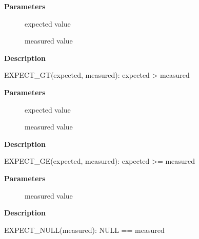 \documentclass[a4paper,8pt,english]{sphinxmanual}
\begin{document}
\textbf{Parameters}
\begin{description}
\item[{}] \leavevmode
expected value

\item[{}] \leavevmode
measured value

\end{description}

\textbf{Description}

EXPECT\_GT(expected, measured): expected \textgreater{} measured

\begin{fulllineitems}
\label{dev-tools/kselftest:c.EXPECT_GE}
\end{fulllineitems}


\textbf{Parameters}
\begin{description}
\item[{}] \leavevmode
expected value

\item[{}] \leavevmode
measured value

\end{description}

\textbf{Description}

EXPECT\_GE(expected, measured): expected \textgreater{}= measured

\begin{fulllineitems}
\label{dev-tools/kselftest:c.EXPECT_NULL}
\end{fulllineitems}


\textbf{Parameters}
\begin{description}
\item[{}] \leavevmode
measured value

\end{description}

\textbf{Description}

EXPECT\_NULL(measured): NULL == measured

\begin{fulllineitems}
\label{dev-tools/kselftest:c.EXPECT_TRUE}
\end{fulllineitems}
\end{document}
